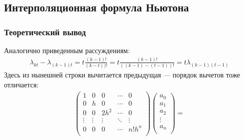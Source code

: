 \subsection{ Интерполяционная формула Ньютона}
\subsubsection{Теоретический вывод}

Аналогично приведенным рассуждениям:
\begin{align}
	\lambda_{kt} - \lambda_{(k-1)t} = t \frac{(k - 1)!}{(k-t))!} = t \frac{(k-1)!}{((k-1)-(t-1))!} = t \lambda_{(k-1)(t-1)}
\end{align}
Здесь из нынешней строки вычитается предыдущая --- порядок вычетов тоже отличается:
\begin{align}
	\begin{pmatrix}
		1      & 0      & 0      & \cdots & 0      \\
		0      & h      & 0      & \cdots & 0      \\
		0      & 0      & 2 h^2  & \cdots & 0      \\
		\vdots & \vdots & \vdots & \ddots & \vdots \\
		0      & 0      & 0      & \cdots & n! h^n \\
	\end{pmatrix}
	\begin{pmatrix}
		a_0    \\
		a_1    \\
		a_2    \\
		\vdots \\
		a_n    \\
	\end{pmatrix} =
\end{align}
